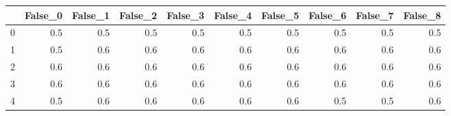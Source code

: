 \begin{tabular}{lrrrrrrrrr}
\toprule
{} &  False\_0 &  False\_1 &  False\_2 &  False\_3 &  False\_4 &  False\_5 &  False\_6 &  False\_7 &  False\_8 \\ \hline
\midrule
0 &      0.5 &      0.5 &      0.5 &      0.5 &      0.5 &      0.5 &      0.5 &      0.5 &      0.5 \\ \hline
1 &      0.5 &      0.6 &      0.6 &      0.6 &      0.6 &      0.6 &      0.6 &      0.6 &      0.6 \\ \hline
2 &      0.6 &      0.6 &      0.6 &      0.6 &      0.6 &      0.6 &      0.6 &      0.6 &      0.6 \\ \hline
3 &      0.6 &      0.6 &      0.6 &      0.6 &      0.6 &      0.6 &      0.6 &      0.6 &      0.6 \\ \hline
4 &      0.5 &      0.6 &      0.6 &      0.6 &      0.6 &      0.6 &      0.5 &      0.5 &      0.6 \\ \hline
\bottomrule
\end{tabular}

